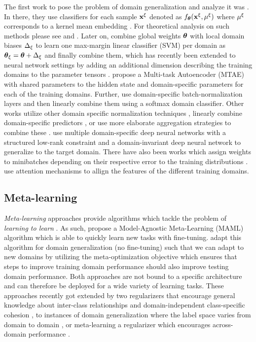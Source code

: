 The first work to pose the problem of domain generalization and analyze it was \citet{BlanchardLS11}. In there, they use classifiers for each sample $\mathbf{x}^\xi$  denoted as $f_{\boldsymbol{\theta}}(\mathbf{x}^\xi, \mu^\xi)$ where $\mu^\xi$ corresponds to a kernel mean embedding \citep{MuandetFSS17}. For theoretical analysis on such methods please see \citet{an2019generalization} and \citet{blanchard2017domain}. Later on, \citet{KhoslaZMET12} combine global weights $\boldsymbol{\theta}$ with local domain biases $\Delta_\xi$ to learn one max-margin linear classifier (SVM) per domain as $\boldsymbol{\theta}_\xi = \boldsymbol{\theta} + \Delta_\xi$ and finally combine them, which has recently been extended to neural network settings by adding an additional dimension describing the training domains to the parameter tensors \citep{LiYSH17}. \citet{GhifaryKZB15} propose a Multi-task Autoencoder (MTAE) with shared parameters to the hidden state and domain-specific parameters for each of the training domains. Further, \citet{ManciniBCR18} use domain-specific batch-normalization \citep{IoffeS15} layers and then linearly combine them using a softmax domain classifier. Other works utilize other domain specific normalization techniques \citep{seo2019learning}, linearly combine domain-specific predictors \citep{ManciniBC018}, or use more elaborate aggregation strategies to combine these \citep{DInnocenteC18}. \citet{DingF18} use multiple
domain-specific deep neural networks with a structured low-rank constraint and a domain-invariant deep neural network to generalize to the target domain. There have also been works which assign weights to minibatches depending on their respective error to the training distributions \citep{HuNSS18, sagawa2019distributionally}. \citet{jin2020feature} use attention mechanisms to allign the features of the different training domains.

\subsection{Meta-learning}
\emph{Meta-learning} approaches provide algorithms which tackle the problem of  \emph{learning  to learn} \citep{1998TP, SchmidhuberZW97}.
 As such, \citet{FinnAL17} propose a Model-Agnostic Meta-Learning (MAML) algorithm which is able to quickly learn new tasks with fine-tuning. \citet{LiYSH18} adapt this algorithm for domain generalization (no fine-tuning) such that we can adapt to new domains by utilizing the meta-optimization objective which ensures that steps to improve training domain performance should also improve testing domain performance. Both approaches are not bound to a specific architecture and can therefore be deployed for a wide variety of learning tasks. These approaches recently got extended by two regularizers that encourage general knowledge about inter-class relationships and domain-independent class-specific cohesion \citep{DouCKG19}, to instances of domain generalization where the label space varies from domain to domain \citep{LiYZH19}, or meta-learning a regularizer which encourages across-domain performance \citep{BalajiSC18}.


